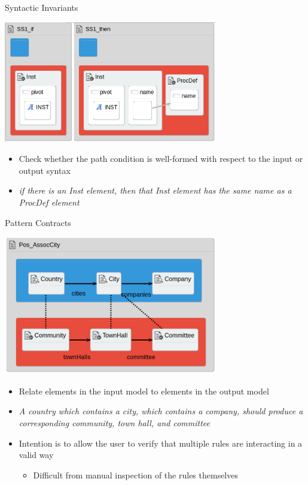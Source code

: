 \documentclass[xcolor=dvipsnames, 12pt, handout]{beamer}
\begin{document}
\begin{frame}{Syntactic Invariants}
\begin{center}
\includegraphics[width=0.7\textwidth]{figures/syntactic_invariant}
\end{center}
\begin{itemize}
\item Check whether the path
condition is well-formed with respect to the input or
output syntax
\item \textit{if there is an Inst element, then that
Inst element has the same name as a ProcDef element}
\end{itemize}
\end{frame}

\begin{frame}{Pattern Contracts}
\begin{center}
\includegraphics[width=0.7\textwidth]{figures/Pos_AssocCity}
\end{center}
\begin{itemize}
\item Relate elements in the input model
to elements in the output model
\item \textit{A country which contains a city, which contains a company, should produce a corresponding community, town hall, and committee}
\item Intention is to allow the user to verify that
multiple rules are interacting in a valid way
\begin{itemize}
\item Difficult from manual inspection of the rules themselves
\end{itemize}
\end{itemize}
\end{frame}
\end{document}
